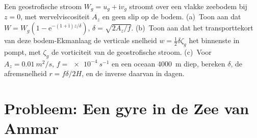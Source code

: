 \begin{exercise}[$\star\star\star$]\label{exo:b3:ocean-dynamics:12}
Een geostrofische stroom $W_g = u_g + \mathrm iv_g$ stroomt over een vlakke
zeebodem bij $z = 0$, met wervelviscositeit $A_z$ en geen slip op de bodem.
(a)~Toon aan dat $W = W_g(1 - \mathrm e^{-(1+\mathrm i)z/\delta})$, $\delta =
\sqrt{2A_z/f}$. (b)~Toon aan dat het transporttekort van deze bodem-Ekmanlaag
de verticale snelheid $w = \tfrac12\delta\zeta_g$ het binnenste in pompt, met
$\zeta_g$ de vorticiteit van de geostrofische stroom. (c)~Voor
$A_z = \qty{0.01}{m^2/s}$, $f = \qty{e-4}{s^{-1}}$ en een oceaan
\qty{4000}{m} diep, bereken $\delta$, de afremsnelheid $r =
f\delta/2H$, en de inverse daarvan in dagen.
\end{exercise}

\section{Probleem: Een gyre in de Zee van Ammar}

